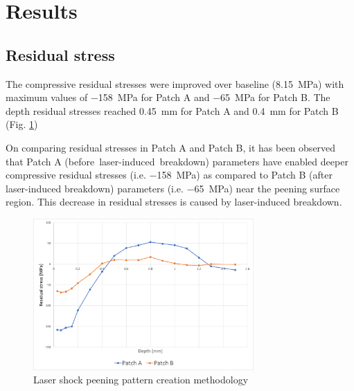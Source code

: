 \documentclass[sn-nature]{sn-jnl}%
\theoremstyle{thmstyleone}%
\theoremstyle{thmstyletwo}%
\theoremstyle{thmstylethree}%
\begin{document}

\section{Results}\label{sec:results}



    \subsection{Residual stress}

    The compressive residual stresses were improved over baseline (\SI[]{8.15}{\mega\pascal}) with maximum values of \SI[]{-158}{\mega\pascal} for Patch A and \SI[]{-65}{\mega\pascal} for Patch B. The depth residual stresses reached \SI[]{0.45}{\mm} for Patch A and \SI[]{0.4}{\mm} for Patch B (Fig. \ref{fig:residual_stress})
    
    On comparing residual stresses in Patch A and Patch B, it has been observed that Patch A \mbox{(before laser-induced breakdown)} parameters have enabled deeper compressive residual stresses (i.e. \SI[]{-158}{\mega\pascal}) as compared to Patch B (after laser-induced breakdown) parameters (i.e. \SI[]{-65}{\mega\pascal}) near the peening surface region. This decrease in residual stresses is caused by laser-induced breakdown. 


    \begin{figure}[h!]     
    \centering
    \includegraphics[width=0.75\textwidth]{residual_stress_depth.png}
    \caption{Laser shock peening pattern creation methodology}
    \label{fig:residual_stress}
    \end{figure}
\end{document}
